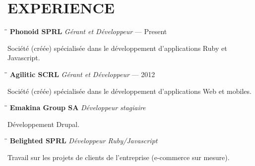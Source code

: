 \section{EXPERIENCE}

\vspace{0.50cm}


\begin{tabbing}
  \hspace{2.3in}\= \hspace{2.6in}\= \kill
  \textbf{Phonoid SPRL} \>\emph{Gérant et Développeur}  — Present\\
\end{tabbing}\vspace{-30pt}

Société (créée) spécialisée dans le développement d’applications Ruby et Javascript.


\begin{tabbing}
  \hspace{2.3in}\= \hspace{2.6in}\= \kill
  \textbf{Agilitic SCRL} \>\emph{Gérant et Développeur}  — 2012\\
\end{tabbing}\vspace{-30pt}

Société (créée) spécialisée dans le développement d’applications Web et mobiles.


\begin{tabbing}
  \hspace{2.3in}\= \hspace{2.6in}\= \kill
  \textbf{Emakina Group SA} \>\emph{Développeur stagiaire} \\
\end{tabbing}\vspace{-30pt}

Développement Drupal.


\begin{tabbing}
  \hspace{2.3in}\= \hspace{2.6in}\= \kill
  \textbf{Belighted SPRL} \>\emph{Développeur Ruby/Javascript} \\
\end{tabbing}\vspace{-30pt}

Travail sur les projets de clients de l'entreprise (e-commerce sur mesure).

